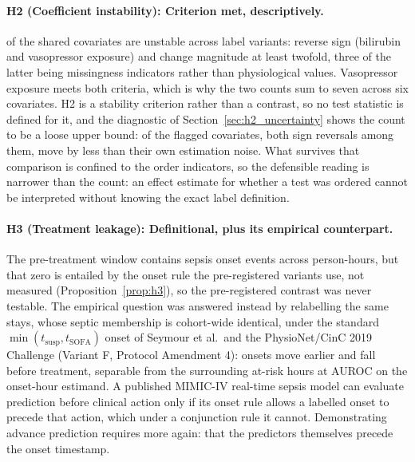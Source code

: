 \paragraph{H2 (Coefficient instability): Criterion met, descriptively.}
\pcHTwoEst{} of the \pcHTwoNTerms{} shared covariates are unstable across label
variants: \pcHTwoNSign{} reverse sign (bilirubin and vasopressor exposure) and
\pcHTwoNMag{} change magnitude at least twofold, three of the latter being
missingness indicators rather than physiological values. Vasopressor exposure
meets both criteria, which is why the two counts sum to seven across six
covariates. H2 is a stability criterion rather than a contrast, so no test
statistic is defined for it, and the diagnostic of
Section~\ref{sec:h2_uncertainty} shows the count to be a loose upper bound:
\pcHTwoNNoise{} of the \pcHTwoNFlagged{} flagged covariates, both sign
reversals among them, move by less than their own estimation noise. What
survives that comparison is confined to the order indicators, so the
defensible reading is narrower than the count: an effect estimate for whether
a test was ordered cannot be interpreted without knowing the exact label
definition.

\paragraph{H3 (Treatment leakage): Definitional, plus its empirical counterpart.}
The pre-treatment window contains \pcPreTreatOnsetsVarB{} sepsis onset events
across \pcPreTreatPersonHoursVarB{} person-hours, but that zero is entailed by
the onset rule the pre-registered variants use, not measured
(Proposition~\ref{prop:h3}), so the pre-registered contrast was never testable.
The empirical question was answered instead by relabelling the same stays,
whose septic membership is cohort-wide identical,
under the standard $\min(t_{\text{susp}}, t_{\text{SOFA}})$ onset of Seymour et
al.\ and the PhysioNet/CinC 2019 Challenge (Variant F, Protocol Amendment 4):
\pcFNMovedEarlier{} onsets move earlier and \pcPreTreatOnsetsVarF{} fall before
treatment, separable from the surrounding at-risk hours at
\pcPreTreatAurocPrimaryF{} AUROC on the onset-hour estimand. A published MIMIC-IV
real-time sepsis model can evaluate prediction before clinical action only if
its onset rule allows a labelled onset to precede that action, which under a
conjunction rule it cannot. Demonstrating advance prediction requires more
again: that the predictors themselves precede the onset timestamp.

